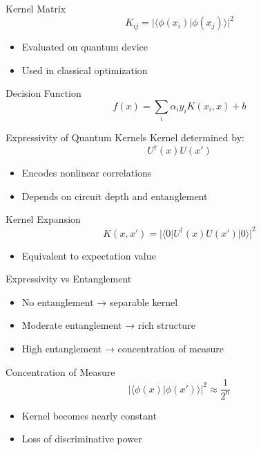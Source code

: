 \documentclass{beamer}
\begin{document}
\begin{frame}{Kernel Matrix}
\[
K_{ij} = |\langle \phi(x_i)|\phi(x_j)\rangle|^2
\]

\begin{itemize}
\item Evaluated on quantum device
\item Used in classical optimization
\end{itemize}
\end{frame}

\begin{frame}{Decision Function}
\[
f(x) = \sum_i \alpha_i y_i K(x_i,x) + b
\]
\end{frame}

\begin{frame}{Expressivity of Quantum Kernels}
Kernel determined by:
\[
U^\dagger(x)U(x')
\]

\begin{itemize}
\item Encodes nonlinear correlations
\item Depends on circuit depth and entanglement
\end{itemize}
\end{frame}

\begin{frame}{Kernel Expansion}
\[
K(x,x') = |\langle 0| U^\dagger(x)U(x') |0\rangle|^2
\]

\begin{itemize}
\item Equivalent to expectation value
\end{itemize}
\end{frame}

\begin{frame}{Expressivity vs Entanglement}
\begin{itemize}
\item No entanglement → separable kernel
\item Moderate entanglement → rich structure
\item High entanglement → concentration of measure
\end{itemize}
\end{frame}

\begin{frame}{Concentration of Measure}
\[
|\langle \phi(x)|\phi(x')\rangle|^2 \approx \frac{1}{2^n}
\]

\begin{itemize}
\item Kernel becomes nearly constant
\item Loss of discriminative power
\end{itemize}
\end{frame}
\end{document}
